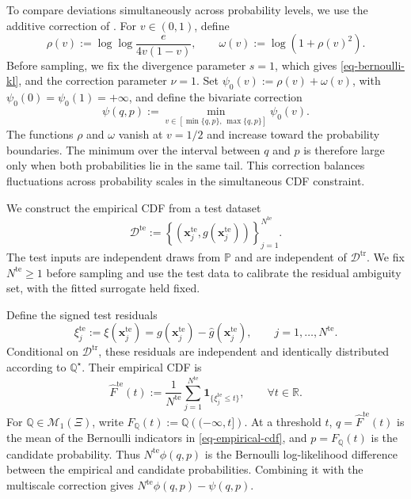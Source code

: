 \documentclass[review,11pt,3p,authoryear,nopreprintline]{elsarticle}
\begin{document}
To compare deviations simultaneously across probability levels, we use the additive correction of \citet{L.J23}. For $v\in(0,1)$, define
\begin{equation*}
  \rho(v):=\log\log\frac{e}{4v(1-v)},\qquad \omega(v):=\log\!\left(1+\rho(v)^2\right).
\end{equation*}
Before sampling, we fix the divergence parameter $s=1$, which gives \eqref{eq-bernoulli-kl}, and the correction parameter $\nu=1$. Set $\psi_0(v):=\rho(v)+\omega(v)$, with $\psi_0(0)=\psi_0(1)=+\infty$, and define the bivariate correction
\begin{equation*}
  \psi(q,p):=\min_{v\in[\min\{q,p\},\,\max\{q,p\}]}\psi_0(v).
\end{equation*}
The functions $\rho$ and $\omega$ vanish at $v=1/2$ and increase toward the probability boundaries. The minimum over the interval between $q$ and $p$ is therefore large only when both probabilities lie in the same tail. This correction balances fluctuations across probability scales in the simultaneous CDF constraint.

We construct the empirical CDF from a test dataset
\[
  \mathcal D^{\mathrm{te}}:=\left\{\left(\bm x_j^{\mathrm{te}},g(\bm x_j^{\mathrm{te}})\right)\right\}_{j=1}^{N^{\mathrm{te}}}.
\]
The test inputs are independent draws from $\mathbb P$ and are independent of $\mathcal D^{\mathrm{tr}}$. We fix $N^{\mathrm{te}}\ge1$ before sampling and use the test data to calibrate the residual ambiguity set, with the fitted surrogate held fixed.

Define the signed test residuals
\[
  \xi_j^{\mathrm{te}}:=\xi(\bm x_j^{\mathrm{te}})=g(\bm x_j^{\mathrm{te}})-\hat g(\bm x_j^{\mathrm{te}}),\qquad j=1,\ldots,N^{\mathrm{te}}.
\]
Conditional on $\mathcal D^{\mathrm{tr}}$, these residuals are independent and identically distributed according to $\mathbb Q^\star$. Their empirical CDF is
\begin{equation}
  \widehat F^{\mathrm{te}}(t):=\frac{1}{N^{\mathrm{te}}}\sum_{j=1}^{N^{\mathrm{te}}}\mathbf 1_{\{\xi_j^{\mathrm{te}}\le t\}},\qquad \forall t\in\mathbb R.
  \label{eq-empirical-cdf}
\end{equation}
For $\mathbb Q\in\mathcal M_1(\Xi)$, write $F_{\mathbb Q}(t):=\mathbb Q\left(({-\infty},t]\right)$. At a threshold $t$, $q=\widehat F^{\mathrm{te}}(t)$ is the mean of the Bernoulli indicators in \eqref{eq-empirical-cdf}, and $p=F_{\mathbb Q}(t)$ is the candidate probability. Thus $N^{\mathrm{te}}\phi(q,p)$ is the Bernoulli log-likelihood difference between the empirical and candidate probabilities. Combining it with the multiscale correction gives $N^{\mathrm{te}}\phi(q,p)-\psi(q,p)$.
\end{document}
